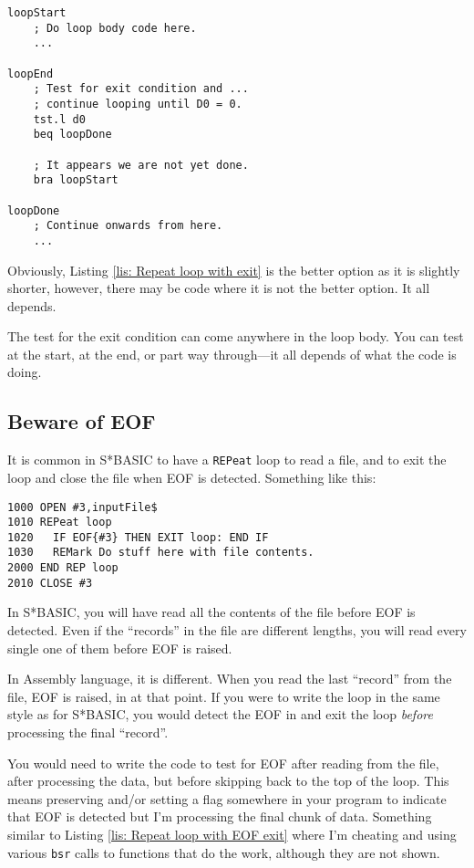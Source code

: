 \begin{lstlisting}[caption={Repeat loops with alternative exit in Assembly Code},label={lis: Repeat loop with alternative exit}]
loopStart
    ; Do loop body code here.
    ...

loopEnd
    ; Test for exit condition and ...
    ; continue looping until D0 = 0.
    tst.l d0
    beq loopDone

    ; It appears we are not yet done.
    bra loopStart

loopDone
    ; Continue onwards from here.
    ...
\end{lstlisting}

Obviously, Listing \ref{lis: Repeat loop with exit} is the better option as it is slightly shorter, however, there may be code where it is not the better option. It all depends.

The test for the exit condition can come anywhere in the loop body. You can test at the start, at the end, or part way through---it all depends of what the code is doing.

\subsection{Beware of EOF}

It is common in S*BASIC to have a \texttt{REPeat} loop to read a file, and to exit the loop and close the file when EOF is detected. Something like this:

\begin{lstlisting}
1000 OPEN #3,inputFile$
1010 REPeat loop
1020   IF EOF{#3} THEN EXIT loop: END IF
1030   REMark Do stuff here with file contents.
2000 END REP loop
2010 CLOSE #3
\end{lstlisting}

In S*BASIC, you will have read all the contents of the file before EOF is detected. Even if the ``records'' in the file are different lengths, you will read every single one of them before EOF is raised.

In Assembly language, it is different. When you read the last ``record'' from the file, EOF is raised, in  at that point. If you were to write the loop in the same style as for S*BASIC, you would detect the EOF in  and exit the loop \emph{before} processing the final ``record''.

You would need to write the code to test for EOF after reading from the file, after processing the data, but before skipping back to the top of the loop. This means preserving  and/or setting a flag somewhere in your program to indicate that EOF is detected but I'm processing the final chunk of data. Something similar to Listing \ref{lis: Repeat loop with EOF exit} where I'm cheating and using various \texttt{bsr} calls to functions that do the work, although they are not shown.

